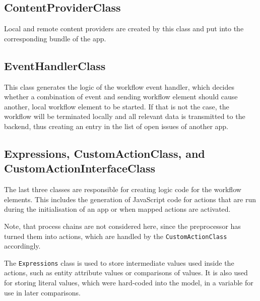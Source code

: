 \subsection{ContentProviderClass}
Local and remote content providers are created by this class and put into the corresponding bundle of the app.

\subsection{EventHandlerClass}
This class generates the logic of the workflow event handler, which decides whether a combination of event and sending workflow element should cause another, local workflow element to be started. If that is not the case, the workflow will be terminated locally and all relevant data is transmitted to the backend, thus creating an entry in the list of open issues of another app.

\subsection{Expressions, CustomActionClass, and CustomActionInterfaceClass}

The last three classes are responsible for creating logic code for the workflow elements. This includes the generation of JavaScript code for actions that are run during the initialisation of an app or when mapped actions are activated. 

Note, that process chains are not considered here, since the preprocessor has turned them into actions, which are handled by the \lstinline|CustomActionClass| accordingly.

The \lstinline|Expressions| class is used to store intermediate values used inside the actions, such as entity attribute values or comparisons of values. It is also used for storing literal values, which were hard-coded into the model, in a variable for use in later comparisons.

